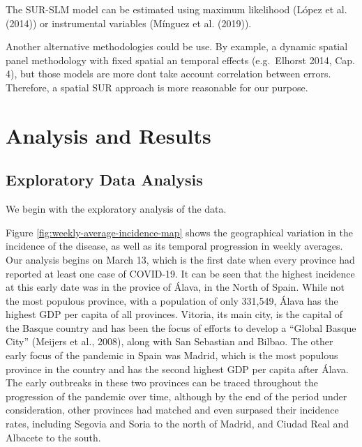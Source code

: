 \documentclass[]{elsarticle} %
\begin{document}
The SUR-SLM model can be estimated using maximum likelihood (López et
al. (2014)) or instrumental variables (Mínguez et al. (2019)).

Another alternative methodologies could be use. By example, a dynamic
spatial panel methodology with fixed spatial an temporal effects
(e.g.~Elhorst 2014, Cap. 4), but those models are more dont take account
correlation between errors. Therefore, a spatial SUR approach is more
reasonable for our purpose.

\hypertarget{analysis-and-results}{%
\section{Analysis and Results}\label{analysis-and-results}}

\hypertarget{exploratory-data-analysis}{%
\subsection{Exploratory Data Analysis}\label{exploratory-data-analysis}}

We begin with the exploratory analysis of the data.

Figure \ref{fig:weekly-average-incidence-map} shows the geographical
variation in the incidence of the disease, as well as its temporal
progression in weekly averages. Our analysis begins on March 13, which
is the first date when every province had reported at least one case of
COVID-19. It can be seen that the highest incidence at this early date
was in the provice of Álava, in the North of Spain. While not the most
populous province, with a population of only 331,549, Álava has the
highest GDP per capita of all provinces. Vitoria, its main city, is the
capital of the Basque country and has been the focus of efforts to
develop a ``Global Basque City'' (Meijers et al., 2008), along with San
Sebastian and Bilbao. The other early focus of the pandemic in Spain was
Madrid, which is the most populous province in the country and has the
second highest GDP per capita after Álava. The early outbreaks in these
two provinces can be traced throughout the progression of the pandemic
over time, although by the end of the period under consideration, other
provinces had matched and even surpased their incidence rates, including
Segovia and Soria to the north of Madrid, and Ciudad Real and Albacete
to the south.
\end{document}
